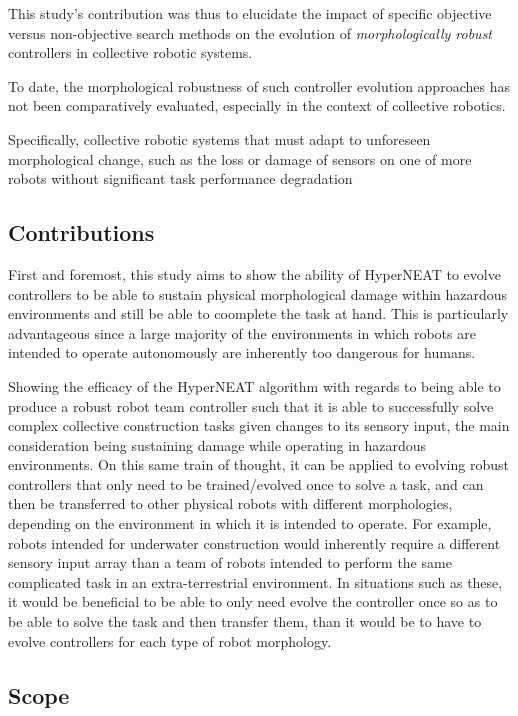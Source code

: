 This study's contribution was thus to elucidate the impact of specific objective versus non-objective search methods on the evolution of \textit{morphologically robust} controllers in collective robotic systems. 

To date, the morphological robustness of such controller evolution approaches has not been comparatively evaluated, especially in the context of collective robotics. 

Specifically, collective robotic systems that must adapt to unforeseen morphological change, such as the loss or damage of sensors on one of more robots without significant task performance degradation \cite{BongardZykovLipson2006} \cite{CullyCluneTaraporeMouret2015}


\subsection{Contributions}

First and foremost, this study aims to show the ability of HyperNEAT to evolve controllers to be able to sustain physical morphological damage within hazardous environments and still be able to coomplete the task at hand. This is particularly advantageous since a large majority of the environments in which robots are intended to operate autonomously are inherently too dangerous for humans.

Showing the efficacy of the HyperNEAT algorithm with regards to being able to produce a robust robot team controller such that it is able to successfully solve complex collective construction tasks given changes to its sensory input, the main consideration being sustaining damage while operating in hazardous environments. On this same train of thought, it can be applied to evolving robust controllers that only need to be trained/evolved once to solve a task, and can then be transferred to other physical robots with different morphologies, depending on the environment in which it is intended to operate. For example, robots intended for underwater construction would inherently require a different sensory input array than a team of robots intended to perform the same complicated task in an extra-terrestrial environment. In situations such as these, it would be beneficial to be able to only need evolve the controller once so as to be able to solve the task and then transfer them, than it would be to have to evolve controllers for each type of robot morphology.


\subsection{Scope}

